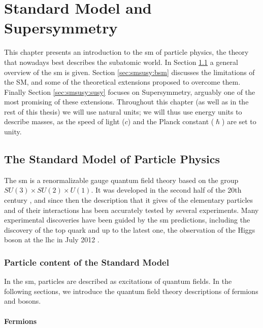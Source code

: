 \chapter{Standard Model and Supersymmetry}
\label{chap:SMSUSY}

This chapter presents an introduction to the \gls{sm} of particle physics, the theory that nowadays best describes the subatomic world. In Section \ref{sec:smsusy:sm} a general overview of the \gls{sm} is given. Section \ref{sec:smsusy:bsm} discusses the limitations of the SM, and some of the theoretical extensions proposed to overcome them. Finally Section \ref{sec:smsusy:susy} focuses on Supersymmetry, arguably one of the most promising of these extensions. Throughout this chapter (as well as in the rest of this thesis) we will use natural units; we will thus use energy units to describe masses, as the speed of light ($c$) and the Planck constant ($\hslash$) are set to unity.


\section{The Standard Model of Particle Physics}
\label{sec:smsusy:sm}

The \gls{sm} is a renormalizable gauge quantum field theory based on the group $SU(3) \times SU(2) \times U(1)$. It was developed in the second half of the 20th century \cite{Glashow:1961tr, Weinberg:1967tq, Salam:1980jd}, and since then the description that it gives of the elementary particles and of their interactions has been accurately tested by several experiments. Many experimental discoveries have been guided by the \gls{sm} predictions, including the discovery of the top quark \cite{Abachi:1994td, PhysRevLett.74.2626} and up to the latest one, the observation of the Higgs boson at the \gls{lhc} in July 2012 \cite{Aad:2012tfa, Chatrchyan:2012xdj}. 

\subsection{Particle content of the Standard Model}

In the \gls{sm}, particles are described as excitations of quantum fields. In the following sections, we introduce the quantum field theory descriptions of fermions and bosons.

\subsubsection*{Fermions}

